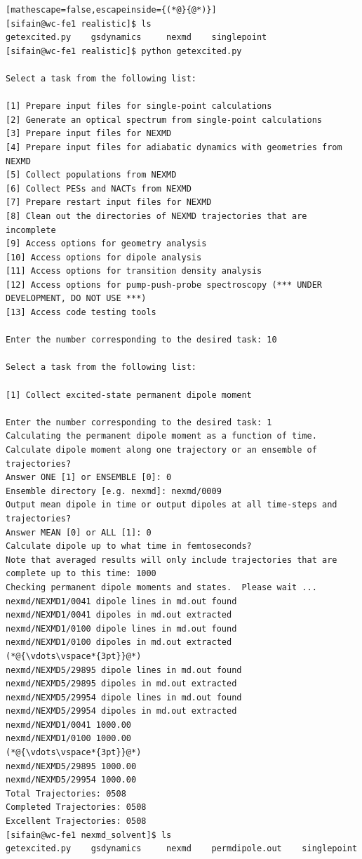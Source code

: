 \documentclass[letterpaper,12pt,titlepage]{article}
\begin{document}
\begin{lstlisting}[mathescape=false,escapeinside={(*@}{@*)}]
[sifain@wc-fe1 realistic]$ ls
getexcited.py    gsdynamics     nexmd    singlepoint
[sifain@wc-fe1 realistic]$ python getexcited.py 

Select a task from the following list:

[1] Prepare input files for single-point calculations
[2] Generate an optical spectrum from single-point calculations
[3] Prepare input files for NEXMD
[4] Prepare input files for adiabatic dynamics with geometries from NEXMD
[5] Collect populations from NEXMD
[6] Collect PESs and NACTs from NEXMD
[7] Prepare restart input files for NEXMD
[8] Clean out the directories of NEXMD trajectories that are incomplete
[9] Access options for geometry analysis
[10] Access options for dipole analysis
[11] Access options for transition density analysis
[12] Access options for pump-push-probe spectroscopy (*** UNDER DEVELOPMENT, DO NOT USE ***)
[13] Access code testing tools

Enter the number corresponding to the desired task: 10

Select a task from the following list:

[1] Collect excited-state permanent dipole moment

Enter the number corresponding to the desired task: 1
Calculating the permanent dipole moment as a function of time.
Calculate dipole moment along one trajectory or an ensemble of trajectories?
Answer ONE [1] or ENSEMBLE [0]: 0
Ensemble directory [e.g. nexmd]: nexmd/0009
Output mean dipole in time or output dipoles at all time-steps and trajectories?
Answer MEAN [0] or ALL [1]: 0
Calculate dipole up to what time in femtoseconds?
Note that averaged results will only include trajectories that are complete up to this time: 1000
Checking permanent dipole moments and states.  Please wait ...
nexmd/NEXMD1/0041 dipole lines in md.out found
nexmd/NEXMD1/0041 dipoles in md.out extracted
nexmd/NEXMD1/0100 dipole lines in md.out found
nexmd/NEXMD1/0100 dipoles in md.out extracted
(*@{\vdots\vspace*{3pt}}@*)
nexmd/NEXMD5/29895 dipole lines in md.out found
nexmd/NEXMD5/29895 dipoles in md.out extracted
nexmd/NEXMD5/29954 dipole lines in md.out found
nexmd/NEXMD5/29954 dipoles in md.out extracted
nexmd/NEXMD1/0041 1000.00
nexmd/NEXMD1/0100 1000.00
(*@{\vdots\vspace*{3pt}}@*)
nexmd/NEXMD5/29895 1000.00
nexmd/NEXMD5/29954 1000.00
Total Trajectories: 0508
Completed Trajectories: 0508
Excellent Trajectories: 0508
[sifain@wc-fe1 nexmd_solvent]$ ls
getexcited.py    gsdynamics     nexmd    permdipole.out    singlepoint
\end{lstlisting}
\end{document}
